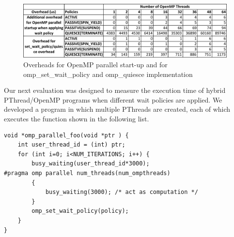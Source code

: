 \begin{figure}[ht]
    \includegraphics[width=0.99\textwidth] {images/parallel_set_quiesce_overhead}
    \caption{Overheads for OpenMP {\sf parallel} start-up and for {\sf omp\_set\_wait\_policy} and {\sf omp\_quiesce} implementation}
    \label{omp:overhead_table}
\end{figure}


Our next evaluation was designed to measure the execution time of hybrid PThread/OpenMP programs when different
wait policies are applied. We developed a program in which multiple PThreads are created, 
each of which executes the function shown in the following list. 
\lstset{basicstyle=\sffamily\footnotesize,language=c, numbersep=1pt}
\begin{lstlisting}[frame=single]  % Start your code-block
void *omp_parallel_foo(void *ptr ) {   
    int user_thread_id = (int) ptr;
    for (int i=0; i<NUM_ITERATIONS; i++) {
        busy_waiting(user_thread_id*3000);
#pragma omp parallel num_threads(num_ompthreads)
        {   
            busy_waiting(3000); /* act as computation */
        }
        omp_set_wait_policy(policy);
    }
}
\end{lstlisting}

